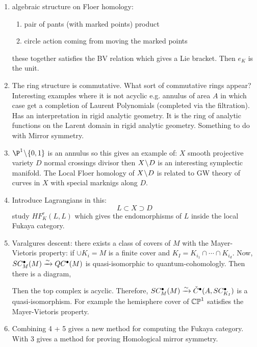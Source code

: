 \documentclass[12pt]{article}
\begin{document}
\begin{enumerate}
\item algebraic structure on Floer homology: 
\begin{enumerate}
\item pair of pants (with marked points) product

\item circle action coming from moving the marked points
\end{enumerate}
these together satisfies the BV relation which gives a Lie bracket. Then $e_K$ is the unit.  

\item The ring structure is commutative. What sort of commutative rings appear? Interesting examples where it is not acyclic e.g. annulus of area $A$ in which case get a completion of Laurent Polynomials (completed via the filtration). Has an interpretation in rigid analytic geometry. It is the ring of analytic functions on the Larent domain in rigid analytic geometry. Something to do with Mirror symmetry. 

\item $\P^1 \sm \{ 0, 1\}$ is an annulus so this gives an example of: $X$ smooth projective variety $D$ normal crossings divisor then $X \! \setminus \! D$ is an interesting symplectic manifold. The Local Floer homology of $X \! \setminus \! D$ is related to GW theory of curves in $X$ with special marknigs along $D$. 

\item Introduce Lagrangians in this:
\[ L \subset X \supset D \]
study $HF^r_K(L, L)$ which gives the endomorphisms of $L$ inside the local Fukaya category.

\item Varalgures descent: there exists a class of covers of $M$ with the Mayer-Vietoris property: if $\cup K_i = M$ is a finite cover and $K_I = K_{i_1} \cap \cdots \cap K_{i_d}$. Now, $SC^\bullet_M(M) \xrightarrow{\sim} QC^\bullet(M)$ is quasi-isomorphic to quantum-cohomologly. Then there is a diagram,
\begin{center}
\end{center}
Then the top complex is acyclic. Therefore, $SC^\bullet_M(M) \xrightarrow{\sim} \check{C}^\bullet(A, SC^\bullet_{K_I})$ is a quasi-isomorphism. For example the hemisphere cover of $\mathbb{CP}^1$ satisfies the Mayer-Vietoris property. 

\item Combining 4 + 5 gives a new method for computing the Fukaya category. With 3 gives a method for proving Homological mirror symmetry. 
\end{enumerate}
\end{document}
